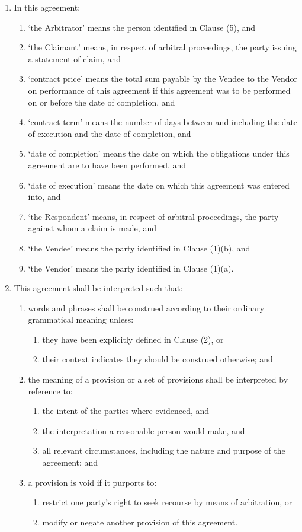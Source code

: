 \documentclass[a4paper,12pt]{article}
\begin{document}
\begin{enumerate}[resume]
	\item In this agreement:
	\begin{enumerate}
		\item `the Arbitrator' means the person identified in Clause (5), and
		\item `the Claimant' means, in respect of arbitral proceedings, the party issuing a statement of claim, and
		\item `contract price' means the total sum payable by the Vendee to the Vendor on performance of this agreement if this agreement was to be performed on or before the date of completion, and
		\item `contract term' means the number of days between and including the date of execution and the date of completion, and
		\item `date of completion' means the date on which the obligations under this agreement are to have been performed, and
		\item `date of execution' means the date on which this agreement was entered into, and
		\item `the Respondent' means, in respect of arbitral proceedings, the party against whom a claim is made, and
		\item `the Vendee' means the party identified in Clause (1)(b), and
		\item `the Vendor' means the party identified in Clause (1)(a).
	\end{enumerate}
	\item This agreement shall be interpreted such that:
	\begin{enumerate}
		\item words and phrases shall be construed according to their ordinary grammatical meaning unless:
		\begin{enumerate}
			\item they have been explicitly defined in Clause (2), or
			\item their context indicates they should be construed otherwise; and
		\end{enumerate}
		\item the meaning of a provision or a set of provisions shall be interpreted by reference to:
		\begin{enumerate}
			\item the intent of the parties where evidenced, and
			\item the interpretation a reasonable person would make, and
			\item all relevant circumstances, including the nature and purpose of the agreement; and
		\end{enumerate}
		\item a provision is void if it purports to:
		\begin{enumerate}
			\item restrict one party's right to seek recourse by means of arbitration, or
			\item modify or negate another provision of this agreement.
		\end{enumerate}
	\end{enumerate}
\end{enumerate}
\end{document}
